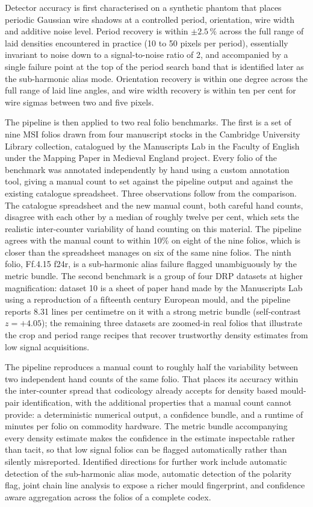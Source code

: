 Detector accuracy is first characterised on a synthetic phantom
that places periodic Gaussian wire shadows at a controlled
period, orientation, wire width and additive noise level. Period
recovery is within $\pm 2.5\,\%$ across the full range of
laid densities encountered in practice (10 to 50 pixels per
period), essentially invariant to noise down to a signal-to-noise
ratio of 2, and accompanied by a single failure point at the
top of the period search band that is identified later as the
sub-harmonic alias mode. Orientation recovery is within one
degree across the full range of laid line angles, and wire width
recovery is within ten per cent for wire sigmas between two and
five pixels.

The pipeline is then applied to two real folio benchmarks. The
first is a set of nine MSI folios drawn from four manuscript
stocks in the Cambridge University Library collection,
catalogued by the Manuscripts Lab in the Faculty of English
under the Mapping Paper in Medieval England project. Every folio
of the benchmark was annotated independently by hand using a
custom annotation tool, giving a manual count to set
against the pipeline output and against the existing catalogue
spreadsheet. Three observations follow from the comparison.
The catalogue spreadsheet and the new manual count,
both careful hand counts, disagree with each other by a median
of roughly twelve per cent, which sets the realistic
inter-counter variability of hand counting on this material. The
pipeline agrees with the manual count to within 10\% on eight of the nine folios, which is closer than the spreadsheet
manages on six of the same nine folios. The ninth folio,
Ff.4.15 f24r, is a sub-harmonic alias failure flagged
unambiguously by the metric bundle. The second benchmark
is a group of four DRP datasets at higher magnification:
dataset 10 is a sheet of paper hand made by the Manuscripts Lab
using a reproduction of a fifteenth century European mould, and
the pipeline reports 8.31 lines per centimetre on it with a
strong metric bundle (self-contrast $z = +4.05$); the remaining
three datasets are zoomed-in real folios that illustrate the
crop and period range recipes that recover trustworthy density
estimates from low signal acquisitions.

The pipeline reproduces a manual count to roughly half
the variability between two independent hand counts of the same
folio. That places its accuracy within the inter-counter spread
that codicology already accepts for density based mould-pair
identification, with the additional properties that a manual
count cannot provide: a deterministic numerical output, a
 confidence bundle, and a runtime of minutes per folio
on commodity hardware. The metric bundle accompanying
every density estimate makes the confidence in the estimate
inspectable rather than tacit, so that low signal folios can be
flagged automatically rather than silently misreported.
Identified directions for further work include automatic
detection of the sub-harmonic alias mode, automatic detection of
the polarity flag, joint chain line analysis to expose a richer
mould fingerprint, and confidence aware aggregation across the
folios of a complete codex.

\newpage

